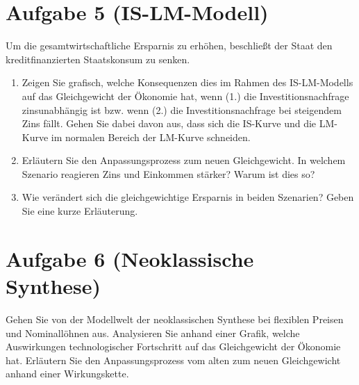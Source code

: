 \documentclass{scrartcl}
\begin{document}
\section*{Aufgabe 5 (IS-LM-Modell)}
Um die gesamtwirtschaftliche Ersparnis zu erh\"{o}hen, beschlie{\ss}t der Staat den kreditfinanzierten Staatskonsum zu senken.
\begin{enumerate}
	\item Zeigen Sie grafisch, welche Konsequenzen dies im Rahmen des IS-LM-Modells auf das Gleichgewicht der \"{O}konomie hat, wenn (1.) die Investitionsnachfrage zinsunabh\"{a}ngig ist bzw. wenn (2.) die Investitionsnachfrage bei steigendem Zins f\"{a}llt. Gehen Sie dabei davon aus, dass sich die IS-Kurve und die LM-Kurve im normalen Bereich der LM-Kurve schneiden.
	\item Erl\"{a}utern Sie den Anpassungsprozess zum neuen Gleichgewicht. In welchem Szenario reagieren Zins und Einkommen st\"{a}rker? Warum ist dies so?
	\item  Wie ver\"{a}ndert sich die gleichgewichtige Ersparnis in beiden Szenarien? Geben Sie eine kurze Erl\"{a}uterung.
\end{enumerate}

\section*{Aufgabe 6 (Neoklassische Synthese)}
Gehen Sie von der Modellwelt der neoklassischen Synthese bei flexiblen Preisen und Nominall\"{o}hnen aus. Analysieren Sie anhand einer Grafik, welche Auswirkungen technologischer Fortschritt auf das Gleichgewicht der \"{O}konomie hat. Erl\"{a}utern Sie den Anpassungsprozess vom alten zum neuen Gleichgewicht anhand einer Wirkungskette.
\end{document}
